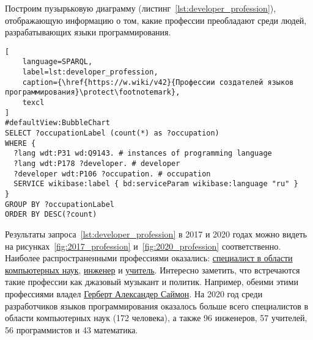 \begin{marginfigure}[-102pt]
{
\setlength{\fboxsep}{0pt}
\setlength{\fboxrule}{1pt}
}
  \caption[Профессии разработчиков языков программирования, 2017 год.]{Профессии разработчиков языков программирования, 2017 год. Размер пузырька показывает число разработчиков с соответствуюшей профессией.}
  \label{fig:2017_profession}
\end{marginfigure}
\begin{marginfigure}[-2pt]
{
\setlength{\fboxsep}{0pt}
\setlength{\fboxrule}{1pt}
}
  \caption[Профессии разработчиков языков программирования программирования, 2020 год.]{Профессии разработчиков языков программирования программирования, 2020 год. Размер пузырька показывает число разработчиков с соответствуюшей профессией.}
  \label{fig:2020_profession}
\end{marginfigure}
Построим пузырьковую диаграмму (листинг~\ref{lst:developer_profession}), отображающую информацию о том, какие профессии преобладают среди людей, разрабатывающих языки программирования.
\begin{lstlisting}[
	language=SPARQL,
	label=lst:developer_profession,
	caption={\href{https://w.wiki/v42}{Профессии создателей языков программирования}\protect\footnotemark},
	texcl
]
#defaultView:BubbleChart
SELECT ?occupationLabel (count(*) as ?occupation)
WHERE {
  ?lang wdt:P31 wd:Q9143. # instances of programming language 
  ?lang wdt:P178 ?developer. # developer
  ?developer wdt:P106 ?occupation. # occupation
  SERVICE wikibase:label { bd:serviceParam wikibase:language "ru" }
}
GROUP BY ?occupationLabel 
ORDER BY DESC(?count)
\end{lstlisting}

Результаты запроса~\ref{lst:developer_profession} в 2017 и 2020 годах можно видеть на рисунках~\ref{fig:2017_profession} и~\ref{fig:2020_profession} соответственно.
Наиболее распространенными профессиями оказались: \href{https://www.wikidata.org/wiki/Q21198}{специалист в области компьютерных наук}, \href{https://www.wikidata.org/wiki/Q81096}{инженер} и \href{https://www.wikidata.org/wiki/Q37226}{учитель}. Интересно заметить, что встречаются такие профессии как джазовый музыкант и политик. Например, обеими этими профессиями владел \href{https://www.wikidata.org/wiki/Q181529}{Герберт Александер Саймон}. На 2020 год среди разработчиков языков программирования оказалось больше всего специалистов в области компьютерных наук (172 человека), а также 96 инженеров, 57 учителей, 56 программистов и 43 математика.

